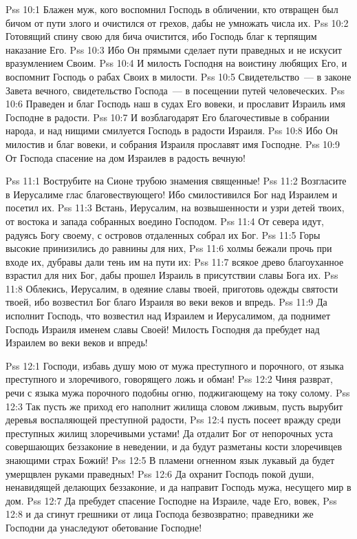 \vs Pss 10:1
Блажен муж, кого воспомнил Господь в обличении, кто отвращен
был бичом от пути злого и очистился от грехов, дабы не умножать числа их.
\vs Pss 10:2
Готовящий спину свою для бича очистится, ибо Господь благ к
терпящим наказание Его.
\vs Pss 10:3
Ибо Он прямыми сделает пути праведных и не искусит вразумлением
Своим.
\vs Pss 10:4
И милость Господня на воистину любящих Его, и воспомнит Господь
о рабах Своих в милости.
\vs Pss 10:5
Свидетельство~--- в законе Завета вечного, свидетельство
Господа~--- в посещении путей человеческих.
\vs Pss 10:6
Праведен и благ Господь наш в судах Его вовеки, и прославит
Израиль имя Господне в радости.
\vs Pss 10:7
И возблагодарят Его благочестивые в собрании народа, и над
нищими смилуется Господь в радости Израиля.
\vs Pss 10:8
Ибо Он милостив и благ вовеки, и собрания Израиля прославят имя
Господне.
\vs Pss 10:9
От Господа спасение на дом Израилев в радость вечную!

\vs Pss 11:1
Вострубите на Сионе трубою знамения священные!
\vs Pss 11:2
Возгласите в Иерусалиме глас благовествующего! Ибо
смилостивился Бог над Израилем и посетил их.
\vs Pss 11:3
Встань, Иерусалим, на возвышенности и узри детей твоих, от
востока и запада собранных воедино Господом.
\vs Pss 11:4
От севера идут, радуясь Богу своему, с островов отдаленных
собрал их Бог.
\vs Pss 11:5
Горы высокие принизились до равнины для них,
\vs Pss 11:6
холмы бежали прочь при входе их, дубравы дали тень им на пути
их:
\vs Pss 11:7
всякое древо благоуханное взрастил для них Бог, дабы прошел
Израиль в присутствии славы Бога их.
\vs Pss 11:8
Облекись, Иерусалим, в одеяние славы твоей, приготовь одежды
святости твоей, ибо возвестил Бог благо Израиля во веки веков и впредь.
\vs Pss 11:9
Да исполнит Господь, что возвестил над Израилем и Иерусалимом,
да поднимет Господь Израиля именем славы Своей! Милость Господня да пребудет
над Израилем во веки веков и впредь!

\vs Pss 12:1
Господи, избавь душу мою от мужа преступного и порочного, от
языка преступного и злоречивого, говорящего ложь и обман!
\vs Pss 12:2
Чиня разврат, речи с языка мужа порочного подобны огню,
поджигающему на току солому.
\vs Pss 12:3
Так пусть же приход его наполнит жилища словом лживым, пусть
вырубит деревья воспаляющей преступной радости,
\vs Pss 12:4
пусть посеет вражду среди преступных жилищ злоречивыми устами!
Да отдалит Бог от непорочных уста совершающих беззаконие в неведении, и да
будут разметаны кости злоречивцев знающими страх Божий!
\vs Pss 12:5
В пламени огненном язык лукавый да будет умерщвлен руками
праведных!
\vs Pss 12:6
Да охранит Господь покой души, ненавидящей делающих беззаконие,
и да направит Господь мужа, несущего мир в дом.
\vs Pss 12:7
Да пребудет спасение Господне на Израиле, чаде Его, вовек,
\vs Pss 12:8
и да сгинут грешники от лица Господа безвозвратно;
праведники же Господни да унаследуют обетование Господне!

